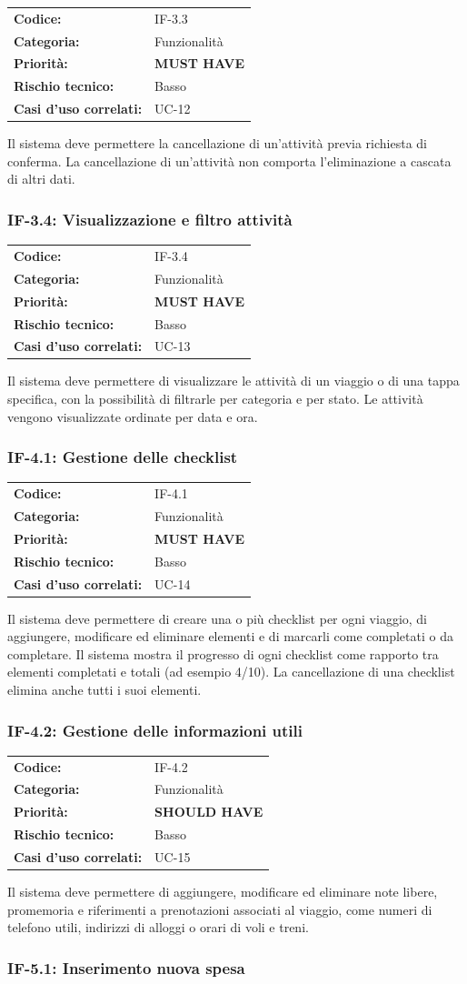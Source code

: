 \documentclass[12pt, a4paper]{article}
\makeatletter
\newcommand{\reqblock}[5]{%
  \begin{tabular}{@{}ll@{}}
    \toprule
    \textbf{Codice:}              & #1 \\
    \textbf{Categoria:}           & #2 \\
    \textbf{Priorità:}            & #3 \\
    \textbf{Rischio tecnico:}     & #4 \\
    \textbf{Casi d'uso correlati:}& #5 \\
    \bottomrule
  \end{tabular}
}
\newcommand{\MUST}{\colorbox{musthave}{\small\textbf{MUST HAVE}}}
\newcommand{\SHOULD}{\colorbox{shouldhave}{\small\textbf{SHOULD HAVE}}}
\newcommand{\RISKL}{\colorbox{risklow}{\small Basso}}
\makeatother
\begin{document}
\medskip
\reqblock{IF-3.3}{Funzionalità}{\MUST}{\RISKL}{UC-12}
\medskip

\noindent
Il sistema deve permettere la cancellazione di un'attività previa richiesta di conferma.
La cancellazione di un'attività non comporta l'eliminazione a cascata di altri dati.

\subsubsection{IF-3.4: Visualizzazione e filtro attività}

\medskip
\reqblock{IF-3.4}{Funzionalità}{\MUST}{\RISKL}{UC-13}
\medskip

\noindent
Il sistema deve permettere di visualizzare le attività di un viaggio o di una tappa
specifica, con la possibilità di filtrarle per categoria e per stato. Le attività
vengono visualizzate ordinate per data e ora.

\subsubsection{IF-4.1: Gestione delle checklist}

\medskip
\reqblock{IF-4.1}{Funzionalità}{\MUST}{\RISKL}{UC-14}
\medskip

\noindent
Il sistema deve permettere di creare una o più checklist per ogni viaggio, di aggiungere,
modificare ed eliminare elementi e di marcarli come completati o da completare. Il sistema
mostra il progresso di ogni checklist come rapporto tra elementi completati e totali
(ad esempio 4/10). La cancellazione di una checklist elimina anche tutti i suoi elementi.

\subsubsection{IF-4.2: Gestione delle informazioni utili}

\medskip
\reqblock{IF-4.2}{Funzionalità}{\SHOULD}{\RISKL}{UC-15}
\medskip

\noindent
Il sistema deve permettere di aggiungere, modificare ed eliminare note libere, promemoria
e riferimenti a prenotazioni associati al viaggio, come numeri di telefono utili, indirizzi
di alloggi o orari di voli e treni.

\subsubsection{IF-5.1: Inserimento nuova spesa}
\end{document}
